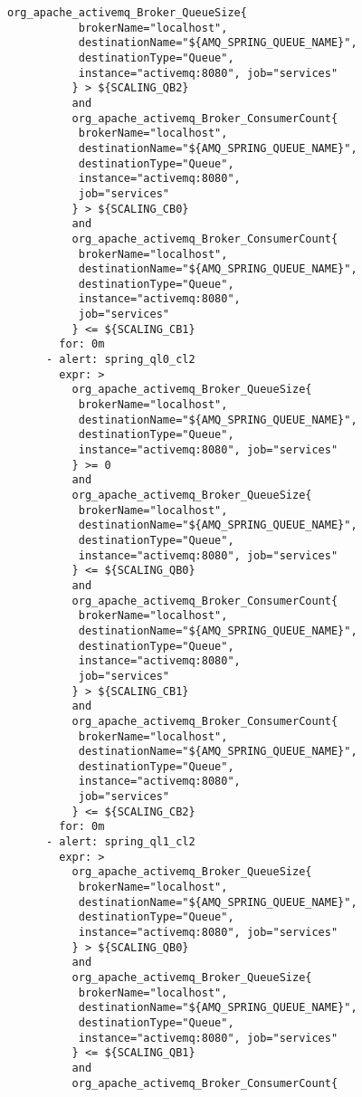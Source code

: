 \begin{lstlisting}[style=bashStyle,caption={alert-unparsed.yml},label=lst:alert-unparsed]
          org_apache_activemq_Broker_QueueSize{
           brokerName="localhost", 
           destinationName="${AMQ_SPRING_QUEUE_NAME}",
           destinationType="Queue", 
           instance="activemq:8080", job="services"
          } > ${SCALING_QB2}
          and 
          org_apache_activemq_Broker_ConsumerCount{
           brokerName="localhost",
           destinationName="${AMQ_SPRING_QUEUE_NAME}", 
           destinationType="Queue",
           instance="activemq:8080", 
           job="services"
          } > ${SCALING_CB0}
          and
          org_apache_activemq_Broker_ConsumerCount{
           brokerName="localhost",
           destinationName="${AMQ_SPRING_QUEUE_NAME}", 
           destinationType="Queue",
           instance="activemq:8080", 
           job="services"
          } <= ${SCALING_CB1}
        for: 0m
      - alert: spring_ql0_cl2
        expr: >
          org_apache_activemq_Broker_QueueSize{
           brokerName="localhost", 
           destinationName="${AMQ_SPRING_QUEUE_NAME}",
           destinationType="Queue", 
           instance="activemq:8080", job="services"
          } >= 0
          and 
          org_apache_activemq_Broker_QueueSize{
           brokerName="localhost", 
           destinationName="${AMQ_SPRING_QUEUE_NAME}",
           destinationType="Queue", 
           instance="activemq:8080", job="services"
          } <= ${SCALING_QB0}
          and 
          org_apache_activemq_Broker_ConsumerCount{
           brokerName="localhost",
           destinationName="${AMQ_SPRING_QUEUE_NAME}", 
           destinationType="Queue",
           instance="activemq:8080", 
           job="services"
          } > ${SCALING_CB1}
          and
          org_apache_activemq_Broker_ConsumerCount{
           brokerName="localhost",
           destinationName="${AMQ_SPRING_QUEUE_NAME}", 
           destinationType="Queue",
           instance="activemq:8080", 
           job="services"
          } <= ${SCALING_CB2}
        for: 0m
      - alert: spring_ql1_cl2
        expr: >
          org_apache_activemq_Broker_QueueSize{
           brokerName="localhost", 
           destinationName="${AMQ_SPRING_QUEUE_NAME}",
           destinationType="Queue", 
           instance="activemq:8080", job="services"
          } > ${SCALING_QB0}
          and 
          org_apache_activemq_Broker_QueueSize{
           brokerName="localhost", 
           destinationName="${AMQ_SPRING_QUEUE_NAME}",
           destinationType="Queue", 
           instance="activemq:8080", job="services"
          } <= ${SCALING_QB1}
          and 
          org_apache_activemq_Broker_ConsumerCount{

\end{lstlisting}

